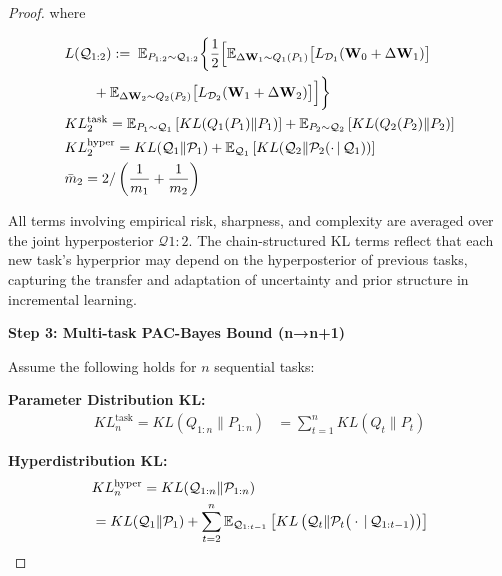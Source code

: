 \documentclass[letterpaper]{article} %
\begin{document}
\begin{proof}
where 

\begin{align*}
&L(\mathcal{Q}_{1:2}) :=\;  \mathbb{E}_{P_{1:2} \sim \mathcal{Q}_{1:2}}
\bigg\{
    \frac{1}{2} \Big[
        \mathbb{E}_{\Delta\mathbf{W}_1 \sim Q_1(P_1)}\big[
            L_{\mathcal{D}_1}(\mathbf{W}_0 + \Delta\mathbf{W}_1)
        \big] \notag \\
& \qquad
        +
        \mathbb{E}_{\Delta\mathbf{W}_2 \sim Q_2(P_2)}\big[
            L_{\mathcal{D}_2}(\mathbf{W}_1 + \Delta\mathbf{W}_2)
        \big]
    \Big]
\bigg\} \\
&KL^{\text{task}}_2 = 
    \mathbb{E}_{P_1 \sim \mathcal{Q}_1}\left[ KL(Q_1(P_1)\|P_1) \right]
    + \mathbb{E}_{P_2 \sim \mathcal{Q}_2}\left[ KL(Q_2(P_2)\|P_2) \right] \\
&KL^{\text{hyper}}_2 = 
    KL(\mathcal{Q}_1\|\mathcal{P}_1)
    + \mathbb{E}_{\mathcal{Q}_1}\left[ KL(\mathcal{Q}_2 \| \mathcal{P}_2(\cdot\,|\,\mathcal{Q}_1)) \right] \\
&\bar{m}_2 = 2 / \left(\frac{1}{m_1} + \frac{1}{m_2}\right)
\end{align*}


 All terms involving empirical risk, sharpness, and complexity are averaged over the joint hyperposterior $\mathcal{Q}{1:2}$. The chain-structured KL terms reflect that each new task's hyperprior may depend on the hyperposterior of previous tasks, capturing the transfer and adaptation of uncertainty and prior structure in incremental learning.


\textbf{Step 3: Multi-task PAC-Bayes Bound (n→n+1)}

Assume the following holds for $n$ sequential tasks:


\textbf{Parameter Distribution KL:}
    \begin{align}
     KL^{\text{task}}_n=KL(Q_{1:n} \| P_{1:n}) 
    &= \sum_{t=1}^n KL(Q_t \| P_t)
    \end{align}

 
\textbf{Hyperdistribution KL:}
    \begin{align}
    &KL^{\text{hyper}}_n=KL(\mathcal{Q}_{1:n} \| \mathcal{P}_{1:n})  \\
    &= KL(\mathcal{Q}_1 \| \mathcal{P}_1) \notag 
      + \sum_{t=2}^n 
        \mathbb{E}_{\mathcal{Q}_{1:t-1}} \left[ 
            KL\left(\mathcal{Q}_t \| \mathcal{P}_t\big(\cdot\,|\,\mathcal{Q}_{1:t-1}\big)\right) 
        \right]
    \end{align}


\end{proof}
\end{document}
